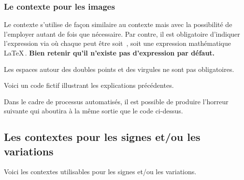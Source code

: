 \subsubsection{Le contexte  pour les images}

Le contexte  s'utilise de façon similaire au contexte  mais avec la possibilité de l'employer autant de fois que nécessaire.
Par contre, il est obligatoire d'indiquer l'expression  via
où chaque  peut être soit \,, soit une expression mathématique \LaTeX\,.
\textbf{Bien retenir qu'il n'existe pas d'expression par défaut.}




\begin{tdocnote}
    Les espaces autour des doubles points et des virgules ne sont pas obligatoires.
\end{tdocnote}




Voici un code fictif illustrant les explications précédentes.



Dans le cadre de processus automatisés, il est possible de produire l'horreur suivante qui aboutira à la même sortie que le code ci-dessus.




\subsection{Les contextes pour les signes et/ou les variations}

Voici les contextes utilisables pour les signes et/ou les variations.

\medskip

\begin{itemize*}[before = \leavevmode\kern15pt, itemjoin = \kern15pt]
	\item {}

	\item {}

	\item {}
\end{itemize*}


